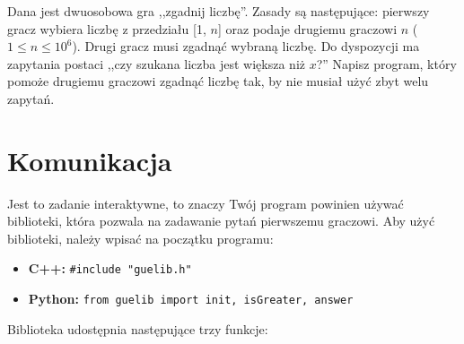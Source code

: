 \documentclass{spiral}
\begin{document}
  \makeheader

  Dana jest dwuosobowa gra ,,zgadnij liczbę''. Zasady są następujące:
  pierwszy gracz wybiera liczbę z przedziału [1, $n$]
  oraz podaje drugiemu graczowi $n$ ($1 \leq n \leq 10^6$).
  Drugi gracz musi zgadnąć wybraną liczbę. 
  Do dyspozycji ma zapytania postaci ,,czy szukana liczba jest większa niż $x$?''
  Napisz program, który pomoże drugiemu graczowi zgadnąć liczbę tak,
  by nie musiał użyć zbyt welu zapytań.

  \section{Komunikacja}
    Jest to zadanie interaktywne,
    to znaczy Twój program powinien używać biblioteki,
    która pozwala na zadawanie pytań pierwszemu graczowi.
    Aby użyć biblioteki, należy wpisać na początku programu:
    \begin{itemize}
        \item \textbf{C++:}
            \verb|#include "guelib.h"|

        \item \textbf{Python:}
            \texttt{from guelib import init, isGreater, answer}
    \end{itemize}
    Biblioteka udostępnia następujące trzy funkcje:
\end{document}

